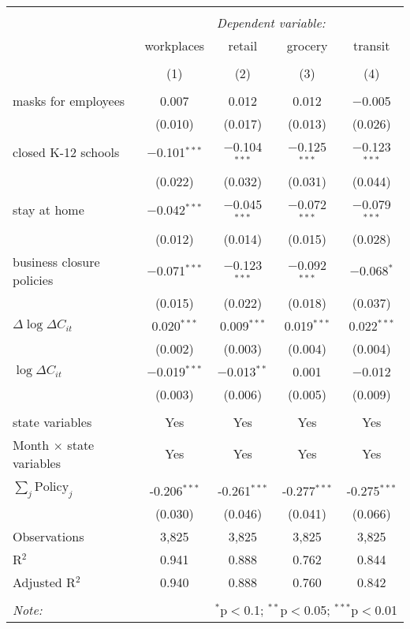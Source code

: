 \begin{tabular}{@{\extracolsep{1pt}}lcccc} 
\\[-1.8ex]\hline 
\hline \\[-1.8ex] 
 & \multicolumn{4}{c}{\textit{Dependent variable:}} \\ 
\cline{2-5} 
 & workplaces & retail & grocery & transit \\ 
\\[-1.8ex] & (1) & (2) & (3) & (4)\\ 
\hline \\[-1.8ex] 
 masks for employees & 0.007 & 0.012 & 0.012 & $-$0.005 \\ 
  & (0.010) & (0.017) & (0.013) & (0.026) \\ 
  closed K-12 schools & $-$0.101$^{***}$ & $-$0.104$^{***}$ & $-$0.125$^{***}$ & $-$0.123$^{***}$ \\ 
  & (0.022) & (0.032) & (0.031) & (0.044) \\ 
  stay at home & $-$0.042$^{***}$ & $-$0.045$^{***}$ & $-$0.072$^{***}$ & $-$0.079$^{***}$ \\ 
  & (0.012) & (0.014) & (0.015) & (0.028) \\ 
  business closure policies & $-$0.071$^{***}$ & $-$0.123$^{***}$ & $-$0.092$^{***}$ & $-$0.068$^{*}$ \\ 
  & (0.015) & (0.022) & (0.018) & (0.037) \\ 
  $\Delta \log \Delta C_{it}$ & 0.020$^{***}$ & 0.009$^{***}$ & 0.019$^{***}$ & 0.022$^{***}$ \\ 
  & (0.002) & (0.003) & (0.004) & (0.004) \\ 
  $\log \Delta C_{it}$ & $-$0.019$^{***}$ & $-$0.013$^{**}$ & 0.001 & $-$0.012 \\ 
  & (0.003) & (0.006) & (0.005) & (0.009) \\ 
 \hline \\[-1.8ex] 
state variables & Yes & Yes & Yes & Yes \\ 
Month $\times$ state variables & Yes & Yes & Yes & Yes \\ 
\hline \\[-1.8ex] 
$\sum_j \mathrm{Policy}_j$ & -0.206$^{***}$ & -0.261$^{***}$ & -0.277$^{***}$ & -0.275$^{***}$ \\ 
 & (0.030) & (0.046) & (0.041) & (0.066) \\ 
Observations & 3,825 & 3,825 & 3,825 & 3,825 \\ 
R$^{2}$ & 0.941 & 0.888 & 0.762 & 0.844 \\ 
Adjusted R$^{2}$ & 0.940 & 0.888 & 0.760 & 0.842 \\ 
\hline 
\hline \\[-1.8ex] 
\textit{Note:}  & \multicolumn{4}{r}{$^{*}$p$<$0.1; $^{**}$p$<$0.05; $^{***}$p$<$0.01} \\ 
\end{tabular} 